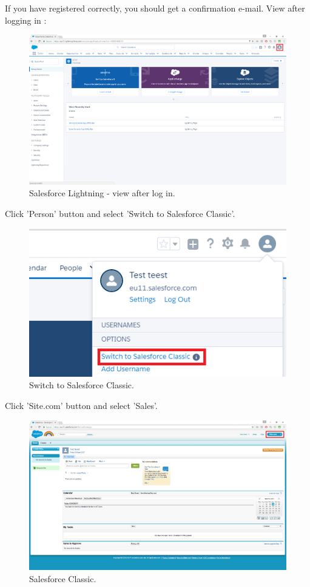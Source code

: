 \documentclass[12pt,a4paper]{article}
\begin{document}
If you have registered correctly, you should get a confirmation e-mail. 
View after logging in :
\begin{figure}[H]
	\centering
	\includegraphics[width = 1 \textwidth]{images/mains.PNG}
	\caption{Salesforce Lightning - view after log in.}
	\label{fig:logq}
\end{figure}
Click 'Person' button and select 'Switch to Salesforce Classic'.
\begin{figure}[H]
	\centering
	\includegraphics{images/change1.PNG}
	\caption{Switch to Salesforce Classic.}
	\label{fig:logw}
\end{figure}
Click 'Site.com' button and select 'Sales'.
\begin{figure}[H]
	\centering
	\includegraphics[width = 1 \textwidth]{images/change2.PNG}
	\caption{Salesforce Classic.}
	\label{fig:loge}
\end{figure}
\end{document}
